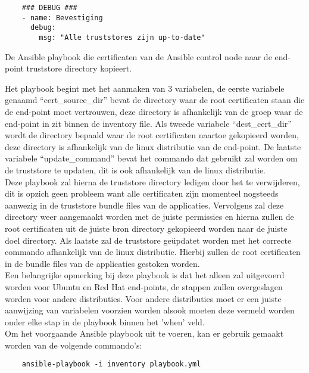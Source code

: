 \begin{listing}[H]\ContinuedFloat
\begin{verbatim}
    ### DEBUG ###
    - name: Bevestiging
      debug:
        msg: "Alle truststores zijn up-to-date"
\end{verbatim}
\caption[]{De Ansible playbook die certificaten van de Ansible control node naar de end-point truststore directory kopieert.}
\end{listing}
Het playbook begint met het aanmaken van 3 variabelen, de eerste variabele genaamd ``cert\_source\_dir'' bevat de directory waar de root certificaten staan die de end-point moet vertrouwen, deze directory is afhankelijk van de groep waar de end-point in zit binnen de inventory file.
Als tweede variabele ``dest\_cert\_dir'' wordt de directory bepaald waar de root certificaten naartoe gekopieerd worden, deze directory is afhankelijk van de linux distributie van de end-point.
De laatste variabele ``update\_command'' bevat het commando dat gebruikt zal worden om de truststore te updaten, dit is ook afhankelijk van de linux distributie. \\

Deze playbook zal hierna de truststore directory ledigen door het te verwijderen, dit is opzich geen probleem want alle certificaten zijn momenteel nogsteeds aanwezig in de truststore bundle files van de applicaties.
Vervolgens zal deze directory weer aangemaakt worden met de juiste permissies en hierna zullen de root certificaten uit de juiste bron directory gekopieerd worden naar de juiste doel directory.
Als laatste zal de truststore geüpdatet worden met het correcte commando afhankelijk van de linux distributie. Hierbij zullen de root certificaten in de bundle files van de applicaties gestoken worden. \\

Een belangrijke opmerking bij deze playbook is dat het alleen zal uitgevoerd worden voor Ubuntu en Red Hat end-points, de stappen zullen overgeslagen worden voor andere distributies. 
Voor andere distributies moet er een juiste aanwijzing van variabelen voorzien worden alsook moeten deze vermeld worden onder elke stap in de playbook binnen het 'when' veld. \\

Om het voorgaande Ansible playbook uit te voeren, kan er gebruik gemaakt worden van de volgende commando's:
\begin{verbatim}
    ansible-playbook -i inventory playbook.yml
\end{verbatim}


